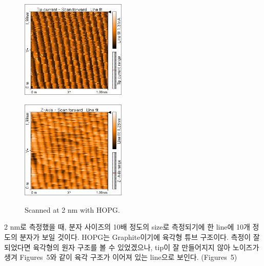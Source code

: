 \documentclass[a4paper, 10pt, nanum]{CSUniSchoolLabReport}
\begin{document}
	\begin{figure}[htb!]
		\centering
		\begin{minipage}{.5\textwidth}
			\centering
			\includegraphics[width=5cm]{Figures/Scan_2nm_1.jpg}
			\label{fig:Scan_2nm1}
		\end{minipage}%
		\begin{minipage}{.5\textwidth}
			\centering
			\includegraphics[width=5cm]{Figures/Scan_2nm_2.jpg}
			\label{fig:Scan_2nm2}
		\end{minipage}
		\caption{Scanned at 2 nm with HOPG.}
	\end{figure}

	2 nm로 측정했을 때, 분자 사이즈의 10배 정도의 size로 측정되기에 한 line에 10개 정도의 분자가 보일 것이다. HOPG는 Graphite이기에 육각형 튜브 구조이다. 측정이 잘 되었다면 육각형의 원자 구조를 볼 수 있었겠으나, tip이 잘 만들어지지 않아 노이즈가 생겨 Figures~5와 같이 육각 구조가 이어져 있는 line으로 보인다. (Figures~5)
\end{document}
